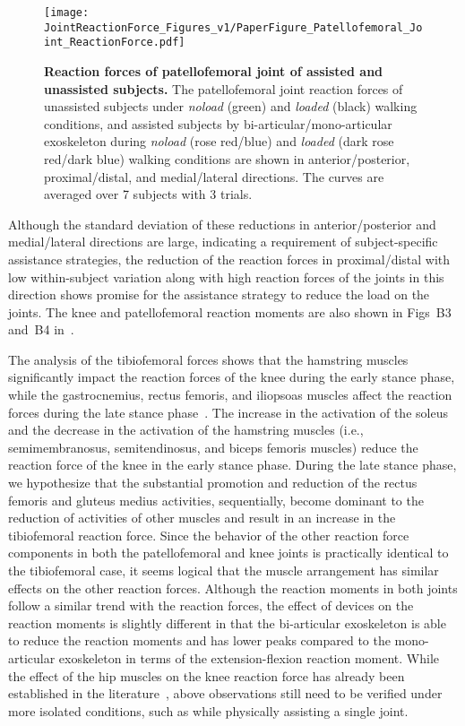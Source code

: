 \documentclass[10pt,letterpaper]{article}
\begin{document}
\begin{figure*}[ht]
	\centering
	\texttt{[image: JointReactionForce\_Figures\_v1/PaperFigure\_Patellofemoral\_Joint\_ReactionForce.pdf]}
	\vspace{-3mm}
	\caption{{\small\textbf{Reaction forces of patellofemoral joint of assisted and unassisted subjects.} The patellofemoral joint reaction forces of unassisted subjects under \emph{noload} (green) and \emph{loaded} (black) walking conditions, and assisted subjects by bi-articular/mono-articular exoskeleton during \textit{noload} (rose red/blue) and \textit{loaded} (dark rose red/dark blue) walking conditions are shown in anterior/posterior, proximal/distal, and medial/lateral directions. The curves are averaged over 7 subjects with 3 trials.}}
	\label{Fig_IdealExo_Patellofemoral_JRF}
\end{figure*}

Although the standard deviation of these reductions in anterior/posterior and medial/lateral directions are large, indicating a requirement of subject-specific assistance strategies, the reduction of the reaction forces in proximal/distal with low within-subject variation along with high reaction forces of the joints in this direction shows promise for the assistance strategy to reduce the load on the joints. The knee and patellofemoral reaction moments are also shown in Figs~B3 and~B4 in~.

The analysis of the tibiofemoral forces shows that the hamstring muscles significantly impact the reaction forces of the knee during the early stance phase, while the gastrocnemius, rectus femoris, and iliopsoas muscles affect the reaction forces during the late stance phase~\cite{DeMers2014,VanVeen2019}.
The increase in the activation of the soleus and the decrease in the activation of the hamstring muscles (i.e., semimembranosus, semitendinosus, and biceps femoris muscles) reduce the reaction force of the knee in the early stance phase. During the late stance phase, we hypothesize that the substantial promotion and reduction of the rectus femoris and gluteus medius activities, sequentially, become dominant to the reduction of activities of other muscles and result in an increase in the tibiofemoral reaction force. Since the behavior of the other reaction force components in both the patellofemoral and knee joints is practically identical to the tibiofemoral case, it seems logical that the muscle arrangement has similar effects on the other reaction forces.  Although the reaction moments in both joints follow a similar trend with the reaction forces, the effect of devices on the reaction moments is slightly different in that the bi-articular exoskeleton is able to reduce the reaction moments and has lower peaks compared to the mono-articular exoskeleton in terms of the extension-flexion reaction moment. While the effect of the hip muscles on the knee reaction force has already been established in the literature~\cite{DeMers2014,VanVeen2019}, above observations still need to be verified under more isolated conditions, such as while physically assisting a single joint.
\end{document}
